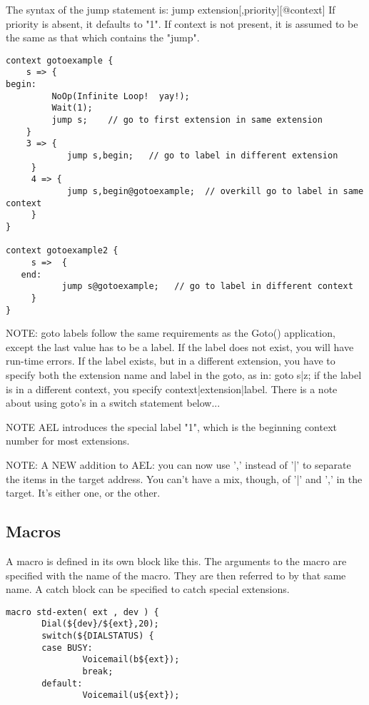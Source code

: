 {The syntax of the jump statement is: jump
extension[,priority][@context] If priority is absent, it defaults to
"1". If context is not present, it is assumed to be the same as that
which contains the "jump".

\begin{verbatim}
context gotoexample {
    s => {
begin:
         NoOp(Infinite Loop!  yay!);
         Wait(1);
         jump s;    // go to first extension in same extension
    }
    3 => {
            jump s,begin;   // go to label in different extension
     }
     4 => {
            jump s,begin@gotoexample;  // overkill go to label in same context
     }
}

context gotoexample2 {
     s =>  {
   end: 
           jump s@gotoexample;   // go to label in different context
     }
}
\end{verbatim}

NOTE: goto labels follow the same requirements as the Goto()
      application, except the last value has to be a label. If the
      label does not exist, you will have run-time errors. If the
      label exists, but in a different extension, you have to specify
      both the extension name and label in the goto, as in: goto s|z;
      if the label is in a different context, you specify
      context|extension|label. There is a note about using goto's in a
      switch statement below...

NOTE  AEL introduces the special label "1", which is the beginning
      context number for most extensions.

NOTE: A NEW addition to AEL: you can now use ',' instead of '|' to 
      separate the items in the target address. You can't have a mix,
      though, of '|' and ',' in the target. It's either one, or the other.




\subsection{Macros}

A macro is defined in its own block like this. The arguments to the
macro are specified with the name of the macro. They are then referred
to by that same name. A catch block can be specified to catch special
extensions.

\begin{verbatim}
macro std-exten( ext , dev ) {
       Dial(${dev}/${ext},20);
       switch(${DIALSTATUS) {
       case BUSY:
               Voicemail(b${ext});
               break;
       default:
               Voicemail(u${ext});


\end{verbatim}}
